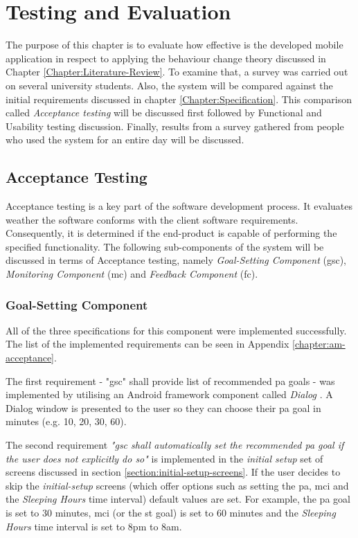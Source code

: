 \chapter{Testing and Evaluation}
The purpose of this chapter is to evaluate how effective is the developed mobile application in respect to applying the behaviour change theory discussed in Chapter \ref{Chapter:Literature-Review}. To examine that, a survey was carried out on several university students. Also, the system will be compared against the initial requirements discussed in chapter \ref{Chapter:Specification}. This comparison called \textit{Acceptance testing} will be discussed first followed by Functional and Usability testing discussion. Finally, results from a survey gathered from people who used the system for an entire day will be discussed.



\section{Acceptance Testing}
Acceptance testing is a key part of the software development process. It evaluates weather the software conforms with the client software requirements. Consequently, it is determined if the end-product is capable of performing the specified functionality. The following sub-components of the system will be discussed in terms of Acceptance testing, namely \textit{Goal-Setting Component} (\gls{gsc}), \textit{Monitoring Component} (\gls{mc}) and \textit{Feedback Component} (\gls{fc}).

\subsection{Goal-Setting Component}
All of the three specifications for this component were implemented successfully. The list of the implemented requirements can be seen in Appendix \ref{chapter:am-acceptance}.

The first requirement - "\gls{gsc}" shall provide list of recommended \gls{pa} goals - was implemented by utilising an Android framework component called \textit{Dialog} \citep{androiddialogs_2017}. A Dialog window is presented to the user so they can choose their \gls{pa} goal in minutes (e.g. 10, 20, 30, 60).

The second requirement \textit{"\gls{gsc} shall automatically set the recommended \gls{pa} goal if the user does not explicitly do so"} is implemented in the \textit{initial setup} set of screens discussed in section \ref{section:initial-setup-screens}. If the user decides to skip the \textit{initial-setup} screens (which offer options such as setting the \gls{pa}, \gls{mci} and the \textit{Sleeping Hours} time interval) default values are set. For example, the \gls{pa} goal is set to 30 minutes, \gls{mci} (or the \gls{st} goal) is set to 60 minutes and the \textit{Sleeping Hours} time interval is set to 8pm to 8am.

